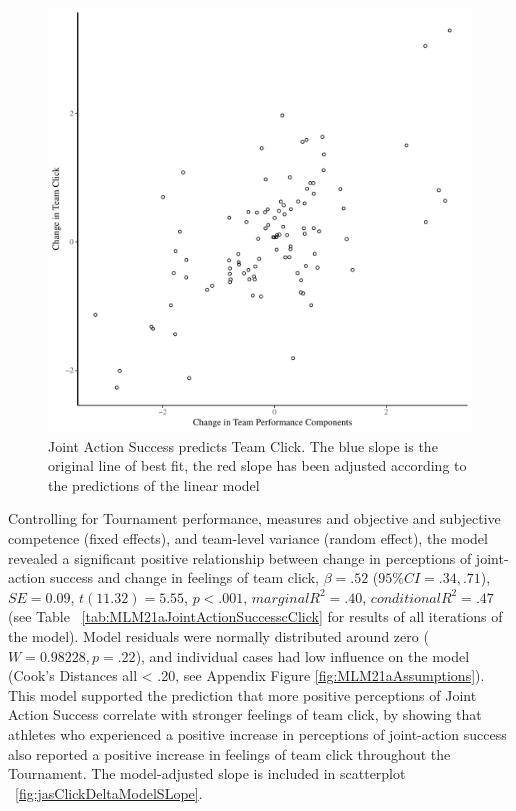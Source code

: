 \begin{figure}[htbp]
  \centering
\includegraphics[scale=.5]{images/jasClickDeltaBasicXY}
  \caption{Joint Action Success predicts Team Click. The blue slope is the original line of best fit, the red slope has been adjusted according to the predictions of the linear model}
  \label{fig:jasClickDeltaBasicXY}
\end{figure}

Controlling for Tournament performance, measures and objective and subjective competence (fixed effects), and team-level variance (random effect), the model revealed a significant positive relationship between change in perceptions of joint-action success and change in feelings of team click, $\beta = .52$ ($95\% CI =  .34, .71$), $SE = 0.09$, $t(11.32) = 5.55$, $p < .001$, $marginal R^2 = .40$, $conditional R^2 = .47$ (see Table ~\ref{tab:MLM21aJointActionSuccesscClick} for results of all iterations of the model).  Model residuals were normally distributed around zero ($W = 0.98228, p = .22$), and individual cases had low influence on the model (Cook's Distances all < .20, see Appendix Figure \ref{fig:MLM21aAssumptions}).  This model supported the prediction that more positive perceptions of Joint Action Success correlate with stronger feelings of team click, by showing that athletes who experienced a positive increase in perceptions of joint-action success also reported a positive increase in feelings of team click throughout the Tournament.
The model-adjusted slope is included in scatterplot ~\ref{fig:jasClickDeltaModelSLope}.

